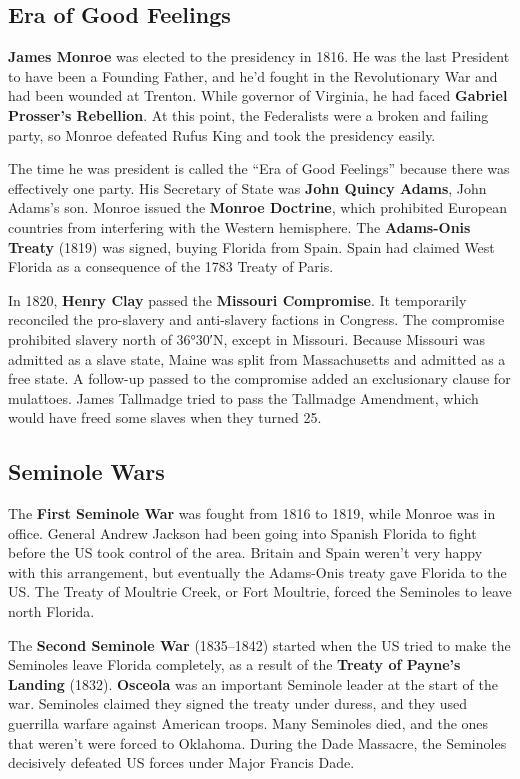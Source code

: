 \subsection*{Era of Good Feelings}

\textbf{James Monroe} was elected to the presidency in 1816.
He was the last President to have been a Founding Father,
and he'd fought in the Revolutionary War and had been wounded at Trenton.
While governor of Virginia, he had faced \textbf{Gabriel Prosser's Rebellion}.
At this point, the Federalists were a broken and failing party,
so Monroe defeated Rufus King and took the presidency easily.

The time he was president is called the ``Era of Good Feelings''
because there was effectively one party.
His Secretary of State was \textbf{John Quincy Adams}, John Adams's son.
Monroe issued the \textbf{Monroe Doctrine},
which prohibited European countries from interfering with the Western hemisphere.
The \textbf{Adams-Onis Treaty} (1819) was signed, buying Florida from Spain.
Spain had claimed West Florida as a consequence of the 1783 Treaty of Paris.

In 1820, \textbf{Henry Clay} passed the \textbf{Missouri Compromise}.
It temporarily reconciled the pro-slavery and anti-slavery factions in Congress.
The compromise prohibited slavery north of \ang{36;30;}N, except in Missouri.
Because Missouri was admitted as a slave state,
Maine was split from Massachusetts and admitted as a free state.
A follow-up passed to the compromise added an exclusionary clause for mulattoes.
James Tallmadge tried to pass the Tallmadge Amendment,
which would have freed some slaves when they turned 25.

\subsection*{Seminole Wars}

The \textbf{First Seminole War} was fought from 1816 to 1819, while Monroe was in office.
General Andrew Jackson had been going into Spanish Florida
to fight before the US took control of the area.
Britain and Spain weren't very happy with this arrangement,
but eventually the Adams-Onis treaty gave Florida to the US\@.
The Treaty of Moultrie Creek, or Fort Moultrie, forced the Seminoles to leave north Florida.

The \textbf{Second Seminole War} (1835--1842)
started when the US tried to make the Seminoles leave Florida completely,
as a result of the \textbf{Treaty of Payne's Landing} (1832).
\textbf{Osceola} was an important Seminole leader at the start of the war.
Seminoles claimed they signed the treaty under duress,
and they used guerrilla warfare against American troops.
Many Seminoles died, and the ones that weren't were forced to Oklahoma.
During the Dade Massacre, the Seminoles decisively defeated US forces under Major Francis Dade.

